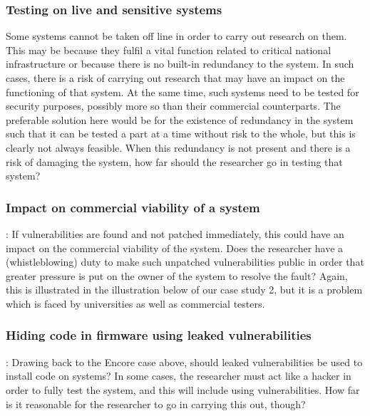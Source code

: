 \documentclass{svjour3}                     %
\begin{document}
\begin{itemize}
\subsubsection{Testing on live and sensitive systems}
Some systems cannot be taken off line in order to carry out research on them. This may be because they fulfil a vital function related to critical national infrastructure or because there is no built-in redundancy to the system. In such cases, there is a risk of carrying out research that may have an impact on the functioning of that system. At the same time, such systems need to be tested for security purposes, possibly more so than their commercial counterparts. The preferable solution here would be for the existence of redundancy in the system such that it can be tested a part at a time without risk to the whole, but this is clearly not always feasible. When this redundancy is not present and there is a risk of damaging the system, how far should the researcher go in testing that system?

\subsubsection{Impact on commercial viability of a system}:
If vulnerabilities are found and not patched immediately, this could have an impact on the commercial viability of the system.  Does the researcher have a (whistleblowing) duty to make such unpatched vulnerabilities public in order that greater pressure is put on the owner of the system to resolve the fault? Again, this is illustrated in the illustration below of our case study 2, but it is a problem which is faced by universities as well as commercial testers.

\subsubsection{Hiding code in firmware using leaked vulnerabilities}:
Drawing back to the Encore case above, should leaked vulnerabilities be used to install code on systems? In some cases, the researcher must act like a hacker in order to fully test the system, and this will include using vulnerabilities. How far is it reasonable for the researcher to go in carrying this out, though?


\end{itemize}
\end{document}

